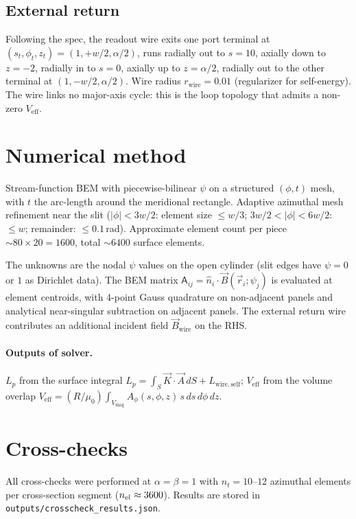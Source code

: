 \documentclass[11pt]{article}
\newcommand{\Veff}{V_{\mathrm{eff}}}
\newcommand{\Lp}{L_p}
\begin{document}
\subsection{External return}
Following the spec, the readout wire exits one port terminal at
$(s_t,\phi_t,z_t)=(1,+w/2,\alpha/2)$, runs radially out to $s=10$,
axially down to $z=-2$, radially in to $s=0$, axially up to $z=\alpha/2$,
radially out to the other terminal at $(1,-w/2,\alpha/2)$. Wire radius
$r_{\mathrm{wire}}=0.01$ (regularizer for self-energy). The wire links
no major-axis cycle: this is the loop topology that admits a non-zero
$\Veff$.

\section{Numerical method}
\label{sec:method}

Stream-function BEM with piecewise-bilinear $\psi$ on a structured
$(\phi,t)$ mesh, with $t$ the arc-length around the meridional
rectangle. Adaptive azimuthal mesh refinement near the slit
($|\phi|<3w/2$: element size $\le w/3$; $3w/2<|\phi|<6w/2$: $\le w$;
remainder: $\le 0.1$\,rad). Approximate element count per piece
$\sim 80\times 20=1600$, total $\sim 6400$ surface elements.

The unknowns are the nodal $\psi$ values on the open cylinder (slit
edges have $\psi=0$ or $1$ as Dirichlet data). The BEM matrix
$\mathsf A_{ij}=\hat n_i\cdot\vec B(\vec r_i;\psi_j)$ is evaluated at
element centroids, with 4-point Gauss quadrature on non-adjacent panels
and analytical near-singular subtraction on adjacent panels. The
external return wire contributes an additional incident field
$\vec B_{\mathrm{wire}}$ on the RHS.

\paragraph{Outputs of solver.}
$\Lp$ from the surface integral
$\Lp=\int_S\vec K\cdot\vec A\,dS+L_{\mathrm{wire,self}}$;
$\Veff$ from the volume overlap
$\Veff=(R/\mu_0)\int_{V_{\mathrm{mag}}}A_\phi(s,\phi,z)\,s\,ds\,d\phi\,dz$.

\section{Cross-checks}
\label{sec:xcheck}

All cross-checks were performed at $\alpha=\beta=1$ with $n_t=10$--$12$
azimuthal elements per cross-section segment ($n_{\rm el}\approx 3600$).
Results are stored in \texttt{outputs/crosscheck\_results.json}.
\end{document}
